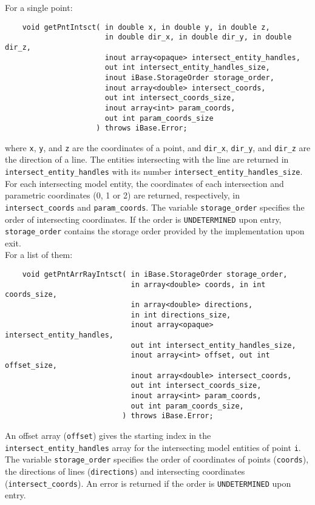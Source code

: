 \documentclass{article}
\begin{document}
\hspace{-16pt}For a single point:
\begin{verbatim}
    void getPntIntsct( in double x, in double y, in double z,
                       in double dir_x, in double dir_y, in double dir_z,
                       inout array<opaque> intersect_entity_handles,
                       out int intersect_entity_handles_size,
                       inout iBase.StorageOrder storage_order,
                       inout array<double> intersect_coords, 
                       out int intersect_coords_size,
                       inout array<int> param_coords, 
                       out int param_coords_size
                     ) throws iBase.Error;
\end{verbatim}
where {\tt x}, {\tt y}, and {\tt z} are the coordinates of a point, and
{\tt dir\_x}, {\tt dir\_y}, and
{\tt dir\_z} are the direction of a line. The entities intersecting with the line
are returned in {\tt intersect\_entity\_handles} with its number
{\tt intersect\_entity\_handles\_size}. For each intersecting model entity, 
 the coordinates of
each intersection and parametric coordinates (0, 1 or 2) are returned,
respectively, in {\tt intersect\_coords} and {\tt param\_coords}. The variable
{\tt storage\_order} specifies the order of intersecting coordinates. If
the order is {\tt UNDETERMINED} upon entry, 
{\tt storage\_order} contains the storage order provided by the implementation upon
exit.\\

\hspace{-16pt}For a list of them:
\begin{verbatim}
    void getPntArrRayIntsct( in iBase.StorageOrder storage_order,
                             in array<double> coords, in int coords_size,
                             in array<double> directions, 
                             in int directions_size,
                             inout array<opaque> intersect_entity_handles,
                             out int intersect_entity_handles_size,
                             inout array<int> offset, out int offset_size,
                             inout array<double> intersect_coords, 
                             out int intersect_coords_size,
                             inout array<int> param_coords, 
                             out int param_coords_size,
                           ) throws iBase.Error;
\end{verbatim}
An offset array ({\tt offset}) gives the starting index in the
{\tt intersect\_entity\_handles} array for the intersecting model entities of point
{\tt i}. The variable {\tt storage\_order} specifies the order of
coordinates of points ({\tt coords}),
the directions of lines ({\tt directions}) and intersecting coordinates
({\tt intersect\_coords}). An error is returned if the order is {\tt UNDETERMINED} upon
entry.
\end{document}
